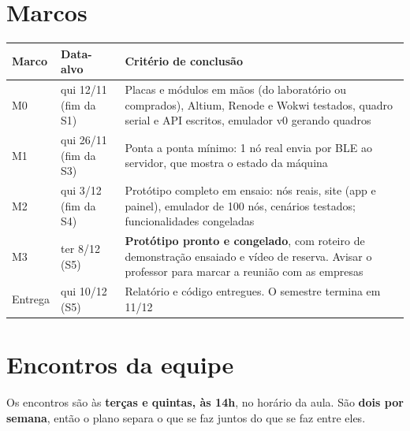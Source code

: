 \documentclass[11pt,a4paper]{article}
\begin{document}
\section{Marcos}

\begin{center}
\begin{tabular}{|L{1.3cm}|L{3.0cm}|L{11.3cm}|}
\hline
\textbf{Marco} & \textbf{Data-alvo} & \textbf{Critério de conclusão} \\ \hline
M0 & qui 12/11 (fim da S1) & Placas e módulos em mãos (do laboratório ou comprados), Altium, Renode e Wokwi testados, quadro serial e API escritos, emulador v0 gerando quadros \\ \hline
M1 & qui 26/11 (fim da S3) & Ponta a ponta mínimo: 1 nó real envia por BLE ao servidor, que mostra o estado da máquina \\ \hline
M2 & qui 3/12 (fim da S4) & Protótipo completo em ensaio: nós reais, site (app e painel), emulador de 100 nós, cenários testados; funcionalidades congeladas \\ \hline
M3 & ter 8/12 (S5) & \textbf{Protótipo pronto e congelado}, com roteiro de demonstração ensaiado e vídeo de reserva. Avisar o professor para marcar a reunião com as empresas \\ \hline
Entrega & qui 10/12 (S5) & Relatório e código entregues. O semestre termina em 11/12 \\ \hline
\end{tabular}
\end{center}

\section{Encontros da equipe}\label{sec:encontros}

Os encontros são às \textbf{terças e quintas, às 14h}, no horário da
aula. São \textbf{dois por semana}, então o plano separa o que se faz juntos do
que se faz entre eles.
\end{document}
